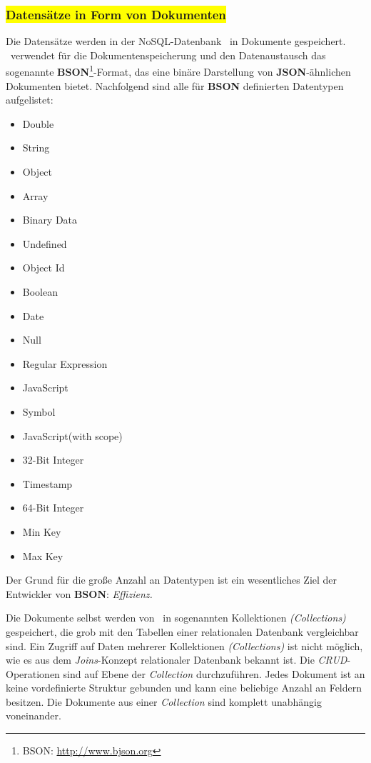 \subsubsection{\colorbox{yellow}{Datensätze in Form von Dokumenten}}
Die Datensätze werden in  der NoSQL-Datenbank \mongo\ in Dokumente gespeichert. \mongo\ verwendet für die Dokumentenspeicherung und den Datenaustausch das sogenannte \textbf{BSON}\footnote{BSON: \url{http://www.bjson.org}}-Format, das eine binäre Darstellung von \textbf{JSON}-ähnlichen Dokumenten bietet. Nachfolgend sind alle für \textbf{BSON} definierten Datentypen aufgelistet:
\begin{multicols}{3}
\begin{itemize}
\item Double
\item String
\item Object
\item Array
\item Binary Data
\item Undefined
\item Object Id
\item Boolean
\item Date
\item Null
\item Regular Expression
\item JavaScript
\item Symbol
\item JavaScript(with scope)
\item 32-Bit Integer
\item Timestamp
\item 64-Bit Integer
\item Min Key
\item Max Key
\end{itemize}
\end{multicols}
Der Grund für die große Anzahl an Datentypen ist ein wesentliches Ziel der Entwickler von \textbf{BSON}: \textit{Effizienz.}

Die Dokumente selbst werden von \mongo\ in sogenannten Kollektionen \textit{(Collections)} gespeichert, die grob mit den Tabellen einer relationalen Datenbank vergleichbar sind. Ein Zugriff auf Daten mehrerer Kollektionen \textit{(Collections)} ist nicht möglich, wie es aus dem \textit{Joins}-Konzept relationaler Datenbank bekannt ist. Die \textit{CRUD}-Operationen sind auf Ebene der \textit{Collection} durchzuführen. Jedes Dokument ist an keine vordefinierte Struktur gebunden und kann eine beliebige Anzahl an Feldern besitzen. Die Dokumente aus einer \textit{Collection} sind komplett unabhängig voneinander. 

